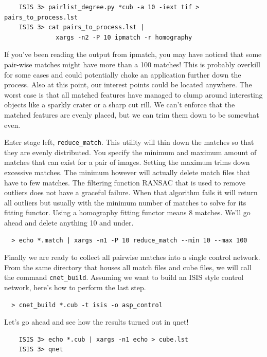 \begin{verbatim}
    ISIS 3> pairlist_degree.py *cub -a 10 -iext tif > pairs_to_process.lst
    ISIS 3> cat pairs_to_process.lst |
              xargs -n2 -P 10 ipmatch -r homography
\end{verbatim}

If you've been reading the output from ipmatch, you may have noticed
that some pair-wise matches might have more than a 100 matches! This
is probably overkill for some cases and could potentially choke an
application further down the process. Also at this point, our interest
points could be located anywhere. The worst case is that all matched
features have managed to clump around interesting objects like a
sparkly crater or a sharp cut rill. We can't enforce that the matched
features are evenly placed, but we can trim them down to be somewhat
even.

Enter stage left, \texttt{reduce\_match}. This utility will thin down
the matches so that they are evenly distributed. You specify the
minimum and maximum amount of matches that can exist for a pair of
images. Setting the maximum trims down excessive matches. The minimum
however will actually delete match files that have to few matches. The
filtering function RANSAC that is used to remove outliers does not
have a graceful failure. When that algorithm fails it will return all
outliers but usually with the minimum number of matches to solve for
its fitting functor. Using a homography fitting functor means 8
matches. We'll go ahead and delete anything 10 and under.

\begin{verbatim}
  > echo *.match | xargs -n1 -P 10 reduce_match --min 10 --max 100
\end{verbatim}

Finally we are ready to collect all pairwise matches into a single
control network. From the same directory that houses all match files
and cube files, we will call the command
\texttt{cnet\_build}. Assuming we want to build an ISIS style control
network, here's how to perform the last step.

\begin{verbatim}
  > cnet_build *.cub -t isis -o asp_control
\end{verbatim}

Let's go ahead and see how the results turned out in qnet!

\begin{verbatim}
    ISIS 3> echo *.cub | xargs -n1 echo > cube.lst
    ISIS 3> qnet
\end{verbatim}

